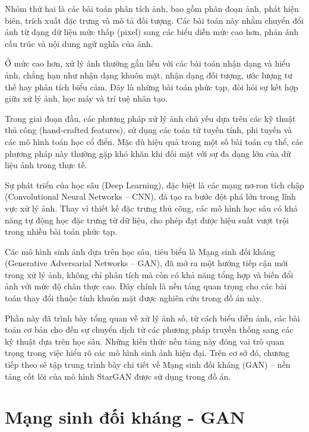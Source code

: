 \documentclass[../DoAn.tex]{subfiles}
\begin{document}
Nhóm thứ hai là các bài toán phân tích ảnh, bao gồm phân đoạn ảnh, phát hiện biên, trích xuất đặc trưng và mô tả đối tượng. Các bài toán này nhằm chuyển đổi ảnh từ dạng dữ liệu mức thấp (pixel) sang các biểu diễn mức cao hơn, phản ánh cấu trúc và nội dung ngữ nghĩa của ảnh.

Ở mức cao hơn, xử lý ảnh thường gắn liền với các bài toán nhận dạng và hiểu ảnh, chẳng hạn như nhận dạng khuôn mặt, nhận dạng đối tượng, ước lượng tư thế hay phân tích biểu cảm. Đây là những bài toán phức tạp, đòi hỏi sự kết hợp giữa xử lý ảnh, học máy và trí tuệ nhân tạo.

Trong giai đoạn đầu, các phương pháp xử lý ảnh chủ yếu dựa trên các kỹ thuật thủ công (hand-crafted features), sử dụng các toán tử tuyến tính, phi tuyến và các mô hình toán học cổ điển. Mặc dù hiệu quả trong một số bài toán cụ thể, các phương pháp này thường gặp khó khăn khi đối mặt với sự đa dạng lớn của dữ liệu ảnh trong thực tế.

Sự phát triển của học sâu (Deep Learning), đặc biệt là các mạng nơ-ron tích chập (Convolutional Neural Networks – CNN), đã tạo ra bước đột phá lớn trong lĩnh vực xử lý ảnh. Thay vì thiết kế đặc trưng thủ công, các mô hình học sâu có khả năng tự động học đặc trưng từ dữ liệu, cho phép đạt được hiệu suất vượt trội trong nhiều bài toán phức tạp.

Các mô hình sinh ảnh dựa trên học sâu, tiêu biểu là Mạng sinh đối kháng (Generative Adversarial Networks – GAN), đã mở ra một hướng tiếp cận mới trong xử lý ảnh, không chỉ phân tích mà còn có khả năng tổng hợp và biến đổi ảnh với mức độ chân thực cao. Đây chính là nền tảng quan trọng cho các bài toán thay đổi thuộc tính khuôn mặt được nghiên cứu trong đồ án này.

Phần này đã trình bày tổng quan về xử lý ảnh số, từ cách biểu diễn ảnh, các bài toán cơ bản cho đến sự chuyển dịch từ các phương pháp truyền thống sang các kỹ thuật dựa trên học sâu. Những kiến thức nền tảng này đóng vai trò quan trọng trong việc hiểu rõ các mô hình sinh ảnh hiện đại. Trên cơ sở đó, chương tiếp theo sẽ tập trung trình bày chi tiết về Mạng sinh đối kháng (GAN) – nền tảng cốt lõi của mô hình StarGAN được sử dụng trong đồ án.









\section{Mạng sinh đối kháng - GAN}
\label{section:2.2}
\end{document}
